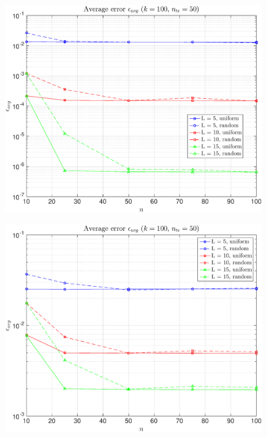 \documentclass[11pt,a4paper]{article}
\theoremstyle{definition}
\theoremstyle{theorem}
\begin{document}
	\begin{figure}
		\center
		\includegraphics[scale=0.5]{fig1}
		\caption{}
	\end{figure}
	
	\begin{figure}
		\center
		\includegraphics[scale=0.5]{fig2}
		\caption{}
	\end{figure}
	
\end{document}
